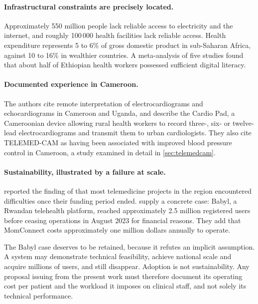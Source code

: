 \documentclass[12pt,a4paper,oneside]{report}
\begin{document}
\paragraph{Infrastructural constraints are precisely located.} Approximately 550 million people lack reliable access to electricity and the internet, and roughly 100\,000 health facilities lack reliable access. Health expenditure represents 5 to 6\% of gross domestic product in sub-Saharan Africa, against 10 to 16\% in wealthier countries. A meta-analysis of five studies found that about half of Ethiopian health workers possessed sufficient digital literacy.

\paragraph{Documented experience in Cameroon.} The authors cite remote interpretation of electrocardiograms and echocardiograms in Cameroon and Uganda, and describe the Cardio Pad, a Cameroonian device allowing rural health workers to record three-, six- or twelve-lead electrocardiograms and transmit them to urban cardiologists. They also cite TELEMED-CAM as having been associated with improved blood pressure control in Cameroon, a study examined in detail in \cref{sec:telemedcam}.

\paragraph{Sustainability, illustrated by a failure at scale.}  reported the finding of \textcite{dodoo2022} that most telemedicine projects in the region encountered difficulties once their funding period ended. \Textcite{segun2025} supply a concrete case: Babyl, a Rwandan telehealth platform, reached approximately 2.5 million registered users before ceasing operations in August 2023 for financial reasons. They add that MomConnect costs approximately one million dollars annually to operate.

The Babyl case deserves to be retained, because it refutes an implicit assumption. A system may demonstrate technical feasibility, achieve national scale and acquire millions of users, and still disappear. Adoption is not sustainability. Any proposal issuing from the present work must therefore document its operating cost per patient and the workload it imposes on clinical staff, and not solely its technical performance.
\end{document}
